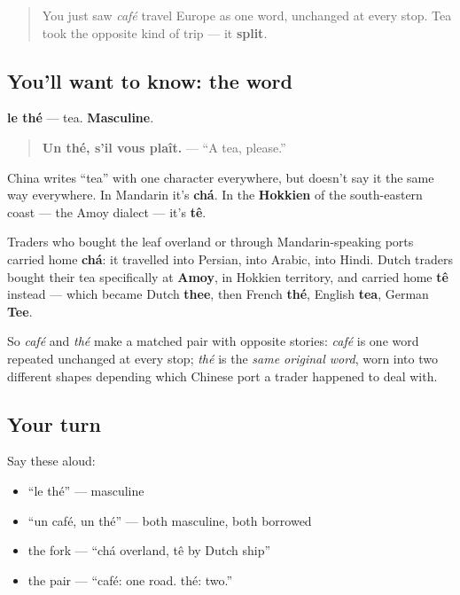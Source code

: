 \label{lesson:FR-C28-the}



\begin{quote}
You just saw \emph{café} travel Europe as one word, unchanged at every stop. Tea took the opposite kind of trip — it \textbf{split}.
\end{quote}

\subsection*{You'll want to know: the word}
\textbf{le thé} — tea. \textbf{Masculine}.

\begin{quote}
\textbf{Un thé, s'il vous plaît.} — \textquotedblleft{}A tea, please.\textquotedblright{}
\end{quote}

\begin{cousinweb}
China writes \textquotedblleft{}tea\textquotedblright{} with one character everywhere, but doesn't say it the same way everywhere. In Mandarin it's \textbf{chá}. In the \textbf{Hokkien} of the south-eastern coast — the Amoy dialect — it's \textbf{tê}.

Traders who bought the leaf overland or through Mandarin-speaking ports carried home \textbf{chá}: it travelled into Persian, into Arabic, into Hindi. Dutch traders bought their tea specifically at \textbf{Amoy}, in Hokkien territory, and carried home \textbf{tê} instead — which became Dutch \textbf{thee}, then French \textbf{thé}, English \textbf{tea}, German \textbf{Tee}.

So \emph{café} and \emph{thé} make a matched pair with opposite stories: \emph{café} is one word repeated unchanged at every stop; \emph{thé} is the \emph{same original word}, worn into two different shapes depending which Chinese port a trader happened to deal with.
\end{cousinweb}

\subsection*{Your turn}
Say these aloud:

\begin{itemize}
\raggedright
  \item \textquotedblleft{}le thé\textquotedblright{} — masculine
  \item \textquotedblleft{}un café, un thé\textquotedblright{} — both masculine, both borrowed
  \item the fork — \textquotedblleft{}chá overland, tê by Dutch ship\textquotedblright{}
  \item the pair — \textquotedblleft{}café: one road. thé: two.\textquotedblright{}
\end{itemize}

